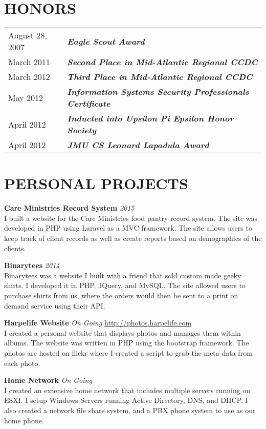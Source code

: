 \documentclass[line, margin]{res}
\begin{document}
\begin{resume}
\section{HONORS}
\begin{tabular}{@{}l l}
August 28, 2007 & \textbf{\textit{Eagle Scout Award}} \\ [5pt]
March 2011 & \textbf{\textit{Second Place in Mid-Atlantic Regional CCDC}} \\ [5pt]
March 2012 & \textbf{\textit{Third Place in Mid-Atlantic Regional CCDC}} \\ [5pt]
May 2012 & \textbf{\textit{Information Systems Security Professionals Certificate}} \\ [5pt]
April 2012 & \textbf{\textit{Inducted into Upsilon Pi Epsilon Honor Society}} \\ [5pt]
April 2012 & \textbf{\textit{JMU CS Leonard Lapadula Award}} \\
\end{tabular}

\section{PERSONAL PROJECTS}
\textbf{Care Ministries Record System} \textit{2015} \\
I built a website for the Care Ministries food pantry record system. The site was developed in PHP using Laravel as a MVC framework. The site allows users to keep track of client records as well as create reports based on demographics of the clients.

\textbf{Binarytees} \textit{2014} \\
Binarytees was a website I built with a friend that sold custom made geeky shirts. I developed it in PHP, JQuery, and MySQL. The site allowed users to purchase shirts from us, where the orders would then be sent to a print on demand service using their API. 

\textbf{Harpelife Website} \textit{On Going} \hfill \url{http://photos.harpelife.com} \\
I created a personal website that displays photos and manages them within albums. The website was written in PHP using the bootstrap framework. The photos are hosted on flickr where I created a script to grab the meta-data from each photo.

\textbf{Home Network} \textit{On Going} \\
I created an extensive home network that includes multiple servers running on ESXI. I setup Windows Servers running Active Directory, DNS, and DHCP. I also created a network file share system, and a PBX phone system to use as our home phone.

\end{resume}
\end{document}
